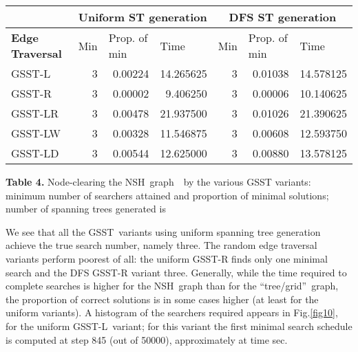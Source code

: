 \documentclass[11pt]{article}\usepackage{amsmath}
\begin{document}
\begin{center}\begin{tabular}
[c]{|l|l|l|l|l|l|l|}\hline
& \multicolumn{3}{|c}{\textbf{Uniform ST generation}} &
\multicolumn{3}{|c|}{\textbf{DFS ST generation}}\\\hline
\textbf{Edge Traversal} & Min & Prop. of min & Time & Min & Prop. of min &
Time\\\hline
GSST-L & \multicolumn{1}{|r|}{3} & \multicolumn{1}{|r|}{0.00224} &
\multicolumn{1}{|r|}{14.265625} & \multicolumn{1}{|r|}{3} &
\multicolumn{1}{|r|}{0.01038} & \multicolumn{1}{|r|}{14.578125}\\\hline
GSST-R & \multicolumn{1}{|r|}{3} & \multicolumn{1}{|r|}{0.00002} &
\multicolumn{1}{|r|}{9.406250} & \multicolumn{1}{|r|}{3} &
\multicolumn{1}{|r|}{0.00006} & \multicolumn{1}{|r|}{10.140625}\\\hline
GSST-LR & \multicolumn{1}{|r|}{3} & \multicolumn{1}{|r|}{0.00478} &
\multicolumn{1}{|r|}{21.937500} & \multicolumn{1}{|r|}{3} &
\multicolumn{1}{|r|}{0.01026} & \multicolumn{1}{|r|}{21.390625}\\\hline
GSST-LW & \multicolumn{1}{|r|}{3} & \multicolumn{1}{|r|}{0.00328} &
\multicolumn{1}{|r|}{11.546875} & \multicolumn{1}{|r|}{3} &
\multicolumn{1}{|r|}{0.00608} & \multicolumn{1}{|r|}{12.593750}\\\hline
GSST-LD & \multicolumn{1}{|r|}{3} & \multicolumn{1}{|r|}{0.00544} &
\multicolumn{1}{|r|}{12.625000} & \multicolumn{1}{|r|}{3} &
\multicolumn{1}{|r|}{0.00880} & \multicolumn{1}{|r|}{13.578125}\\\hline
\end{tabular}



\end{center}

\noindent\textbf{Table 4. }Node-clearing the NSH\ graph\ \ by the various GSST
variants: minimum number of searchers attained and proportion of minimal
solutions; number of spanning trees generated is 

\bigskip

We see that all the GSST\ variants using uniform spanning tree generation
achieve the true search number, namely three. The random edge traversal
variants perform poorest of all: the uniform GSST-R finds only one minimal
search and the DFS GSST-R variant three. Generally, while the time required to
complete  searches is higher for the NSH\ graph than for the
\textquotedblleft tree/grid\textquotedblright\ graph, the proportion of
correct solutions is in some cases higher (at least for the uniform variants).
A histogram of the searchers required appears in Fig.\ref{fig10}, for the
uniform GSST-L\ variant; for this variant the first minimal search schedule is
computed at step 845 (out of 50000), approximately at time sec.
\end{document}
